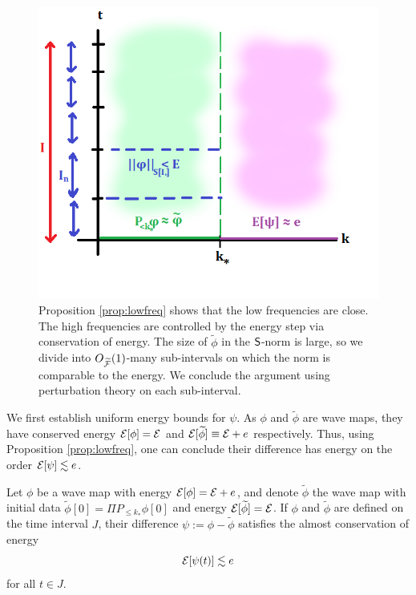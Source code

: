 \begin{figure}[h]
	\begin{center}
		\includegraphics[scale = 0.7]{graphics/induction}
		\caption{Proposition \ref{prop:lowfreq} shows that the low frequencies are close. The high frequencies are controlled by the energy step via conservation of energy. The size of $\widetilde \phi$ in the $\mathsf S$-norm is large, so we divide into $O_{\widetilde {\mathcal F}} (1)$-many sub-intervals on which the norm is comparable to the energy. We conclude the argument using perturbation theory on each sub-interval. 
		}
	\end{center}
\end{figure}

We first establish uniform energy bounds for $\psi$. As $\phi$ and $\widetilde\phi$ are wave maps, they have conserved energy $\mathcal E[\phi] = \mathcal E$ and $\mathcal E[\widetilde \phi] \equiv \mathcal E + e$ respectively. Thus, using Proposition \ref{prop:lowfreq}, one can conclude their difference has energy on the order $\mathcal E[\psi] \lesssim e$. 

\begin{lemma}
	Let $\phi$ be a wave map with energy $\mathcal E[\phi] = \mathcal E + e$, and denote $\widetilde \phi$ the wave map with initial data $\widetilde \phi[0] = \Pi P_{\leq k_*} \phi[0]$ and energy $\mathcal E[\widetilde \phi] = \mathcal E$. If $\phi$ and $\widetilde \phi$ are defined on the time interval $J$, their difference $\psi := \phi - \widetilde \phi$ satisfies the almost conservation of energy
		\begin{equation}
			\mathcal E[\psi(t)] \lesssim e\label{eq:psiconserve}
		\end{equation}
	for all $t \in J$. 
\end{lemma}

